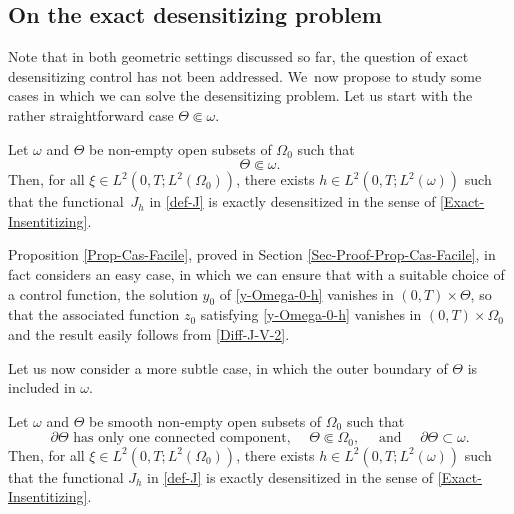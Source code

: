 \subsection*{On the exact desensitizing problem}

Note that in both geometric settings discussed so far, the question of exact desensitizing control has not been addressed. We~now propose to study some cases in which we can solve the desensitizing problem. Let us start with the rather straightforward case $ \Theta \Subset \omega$.

\begin{proposition}
\label{Prop-Cas-Facile}
Let $\omega$ and $\Theta$ be non-empty open subsets of $\Omega_0$ such that
\begin{equation}
\label{Assumption-EasyCase}
\Theta \Subset \omega.
\end{equation}
Then, for all $\xi\!\in\! L^2(0,T; L^2(\Omega_0))$, there exists $h\!\in\! L^2(0,T; L^2(\omega))$ such that the func\-tional~$J_h$ in \eqref{def-J} is exactly desensitized in the sense of \eqref{Exact-Insentitizing}.
\end{proposition}

Proposition \ref{Prop-Cas-Facile}, proved in Section \ref{Sec-Proof-Prop-Cas-Facile}, in fact considers an easy case, in which we can ensure that with a suitable choice of a control function, the solution $y_0$ of \eqref{y-Omega-0-h} vanishes in $(0,T) \times \Theta$, so that the associated function $z_0$ {satisfying} \eqref{y-Omega-0-h} vanishes in $(0,T) \times \Omega_0$ and the result easily follows from \eqref{Diff-J-V-2}.

Let us now consider a more subtle case, in which the outer boundary of $\Theta$ is included in $\omega$.

\begin{theorem}
\label{Thm-insensitizing-Boundary}
Let $\omega$ and $\Theta$ be smooth non-empty open subsets of $\Omega_0$ such that
\begin{equation}
\label{Assumption-insensitizing-Boundary}
\partial \Theta \text{ has only one connected component, } \quad \Theta \Subset \Omega_0, \quad \text{ and } \quad \partial \Theta \subset \omega.
\end{equation}
Then, for all $\xi \in L^2(0,T; L^2(\Omega_0))$, there exists $h \in L^2(0,T; L^2(\omega))$ such that the functional $J_h$ in \eqref{def-J} is exactly desensitized in the sense of \eqref{Exact-Insentitizing}.
\end{theorem}

